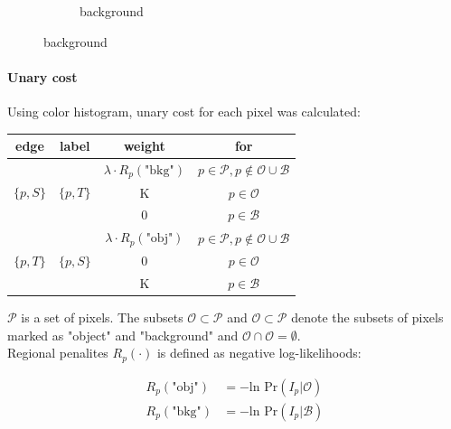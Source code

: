 \documentclass[paper=a4, fontsize=11pt]{scrartcl} %
\numberwithin{equation}{section} %
\numberwithin{figure}{section} %
\numberwithin{table}{section} %
\begin{document}
\begin{figure}[b]
\begin{subfigure}[b]{0.25\textwidth}
{		}
	\caption{background}
	\end{subfigure}
\end{figure}

\paragraph{Unary cost}

Using color histogram, unary cost for each pixel was calculated:

\begin{table}[H]
 \label{tab:title} 
\centering
\begin{tabular}{| c | c | c | c | }
\hline
edge						& label						& weight 								& for	\\
\hline 
\multirow{3}{*}{$\{p, S\}$}	& \multirow{3}{*}{$\{ p, T\}$} 	& $\lambda \cdot R_p(\text{"bkg"})$		& $p \in \mathcal{P}, p \notin \mathcal{O} \cup\mathcal{B}$ \\ \cline{3-4}
							&								& K										& $p \in \mathcal{O}$ \\ \cline{3-4}
							&								& 0										& $p \in \mathcal{B}$ \\ \hline	
\multirow{3}{*}{$\{p, T\}$}	& \multirow{3}{*}{$\{ p, S\}$} 	& $\lambda \cdot R_p(\text{"obj"})$		& $p \in \mathcal{P}, p \notin \mathcal{O} \cup\mathcal{B}$ \\ \cline{3-4}
							&								& 0										& $p \in \mathcal{O}$ \\ \cline{3-4}
							&								& K										& $p \in \mathcal{B}$ \\ \hline	
\end{tabular}
\end{table}

$\mathcal{P}$ is a set of pixels. The subsets $\mathcal{O} \subset \mathcal{P}$ and $\mathcal{O} \subset \mathcal{P}$ denote the subsets of pixels marked as "object" and "background" and $\mathcal{O} \cap \mathcal{O} = \emptyset$. \\

Regional penalites $R_p(\cdot)$ is defined as negative log-likelihoods:

\begin{equation}
	\begin{split}
		R_p(\text{"obj"}) &= - \text{ln Pr}(I_p | \mathcal{O}) \\
		R_p(\text{"bkg"}) &= - \text{ln Pr}(I_p | \mathcal{B}) 	
	\end{split}
\end{equation}
\end{document}
